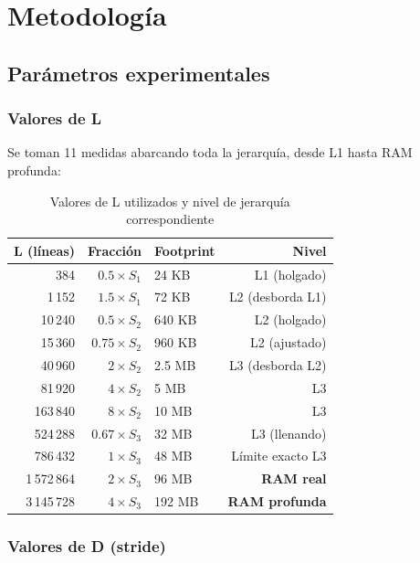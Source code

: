 \documentclass[12pt,a4paper]{article}
\begin{document}
\section{Metodología}

\subsection{Parámetros experimentales}

\subsubsection*{Valores de L}

Se toman 11 medidas abarcando toda la jerarquía, desde L1 hasta RAM profunda:

\begin{table}[H]
\centering
\caption{Valores de L utilizados y nivel de jerarquía correspondiente}
\label{tab:valoresL}
\begin{tabular}{rrlr}
\toprule
\textbf{L (líneas)} & \textbf{Fracción} & \textbf{Footprint} & \textbf{Nivel} \\
\midrule
384       & $0.5 \times S_1$    & 24 KB   & L1 (holgado) \\
1\,152    & $1.5 \times S_1$    & 72 KB   & L2 (desborda L1) \\
10\,240   & $0.5 \times S_2$    & 640 KB  & L2 (holgado) \\
15\,360   & $0.75 \times S_2$   & 960 KB  & L2 (ajustado) \\
40\,960   & $2 \times S_2$      & 2.5 MB  & L3 (desborda L2) \\
81\,920   & $4 \times S_2$      & 5 MB    & L3 \\
163\,840  & $8 \times S_2$      & 10 MB   & L3 \\
524\,288  & $0.67 \times S_3$   & 32 MB   & L3 (llenando) \\
786\,432  & $1 \times S_3$      & 48 MB   & Límite exacto L3 \\
1\,572\,864 & $2 \times S_3$   & 96 MB   & \textbf{RAM real} \\
3\,145\,728 & $4 \times S_3$   & 192 MB  & \textbf{RAM profunda} \\
\bottomrule
\end{tabular}
\end{table}

\subsubsection*{Valores de D (stride)}
\end{document}
